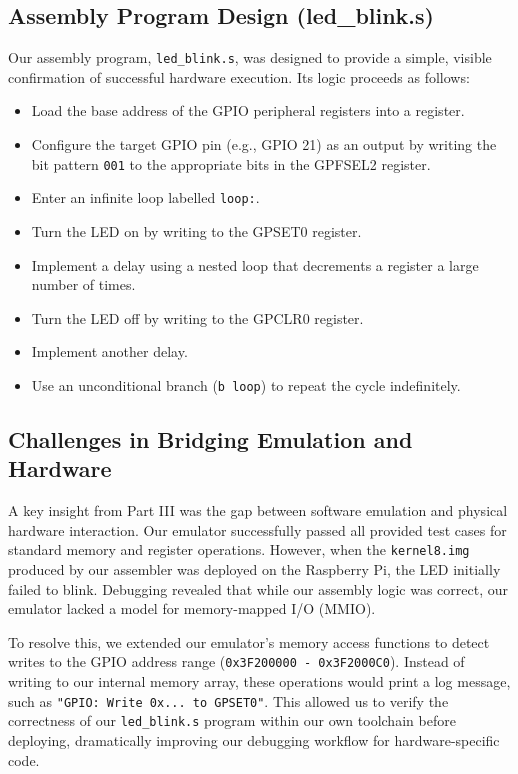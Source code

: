 \documentclass[11pt]{article}
\begin{document}
\subsection{Assembly Program Design (led\_blink.s)}
Our assembly program, \texttt{led\_blink.s}, was designed to provide a simple, visible confirmation of successful hardware execution. Its logic proceeds as follows:
\begin{itemize}
    \item Load the base address of the GPIO peripheral registers into a register.
    \item Configure the target GPIO pin (e.g., GPIO 21) as an output by writing the bit pattern \texttt{001} to the appropriate bits in the GPFSEL2 register.
    \item Enter an infinite loop labelled \texttt{loop:}.
    \item Turn the LED on by writing to the GPSET0 register.
    \item Implement a delay using a nested loop that decrements a register a large number of times.
    \item Turn the LED off by writing to the GPCLR0 register.
    \item Implement another delay.
    \item Use an unconditional branch (\texttt{b loop}) to repeat the cycle indefinitely.
\end{itemize}

\subsection{Challenges in Bridging Emulation and Hardware}
A key insight from Part III was the gap between software emulation and physical hardware interaction. Our emulator successfully passed all provided test cases for standard memory and register operations. However, when the \texttt{kernel8.img} produced by our assembler was deployed on the Raspberry Pi, the LED initially failed to blink. Debugging revealed that while our assembly logic was correct, our emulator lacked a model for memory-mapped I/O (MMIO).

To resolve this, we extended our emulator's memory access functions to detect writes to the GPIO address range (\texttt{0x3F200000 - 0x3F2000C0}). Instead of writing to our internal memory array, these operations would print a log message, such as \texttt{"GPIO: Write 0x... to GPSET0"}. This allowed us to verify the correctness of our \texttt{led\_blink.s} program within our own toolchain before deploying, dramatically improving our debugging workflow for hardware-specific code.
\end{document}

